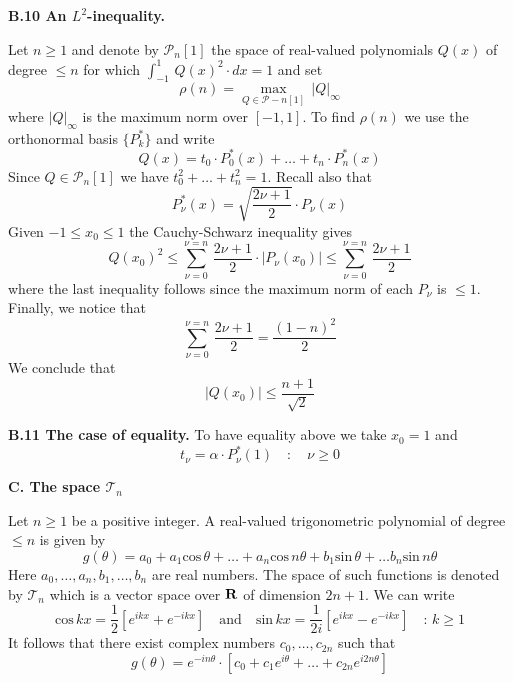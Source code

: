 \documentclass{amsart}
\begin{document}
{\centerline {\bf {B.10 An $L^2$-inequality.}}
\medskip

\noindent
Let $n\geq 1$ and denote by $\mathcal P_n[1]$ the space of
real-valued polynomials $Q(x)$ of degree $\leq n$ for which
$\int_{-1}^1\, Q(x)^2\cdot dx=1$ and set
\[ 
\rho(n)=\max_{Q\in\mathcal P-n[1]}\,
|Q|_\infty
\] 
where $|Q|_\infty$ is the maximum norm over
$[-1,1]$.
To find  $\rho(n)$ we use the orthonormal basis $\{P_k^*\}$
and write
\[
Q(x)=t_0\cdot P_0^*(x)+\ldots+t_n\cdot P_n^*(x)
\]
Since $Q\in\mathcal P_n[1]$ we have
$t_0^2+\ldots+t_n^2=1$. Recall also that
\[
P_\nu^*(x)=\sqrt{\frac{2\nu+1}{2}}\cdot P_\nu(x)
\]
Given $-1\leq x_0\leq 1$ the Cauchy-Schwarz inequality gives
\[
Q(x_0)^2\leq \sum_{\nu=0}^{\nu=n}\,
\frac{2\nu+1}{2}\cdot |P_\nu(x_0)|\leq 
\sum_{\nu=0}^{\nu=n}\,\frac{2\nu+1}{2}
\]
where the last inequality follows since the maximum norm of
each $P_\nu$ is $\leq 1$.
Finally, we notice that
\[
\sum_{\nu=0}^{\nu=n}\,\frac{2\nu+1}{2}
=\frac{(1-n)^2}{2}
\]
We conclude that
\[
|Q(x_0)|\leq \frac{n+1}{\sqrt{2}}
\]
\medskip

\noindent
{\bf B.11 The case of equality.}
To have equality above we take  $x_0=1$ and 
\[
 t_\nu=\alpha\cdot P^*_\nu(1)\quad\colon\quad \nu\geq 0
\]
\bigskip

























\centerline{\bf {C. The space $\mathcal T_n$}}
\bigskip

\noindent
Let $n\geq 1$ be a positive integer.
A real-valued trigonometric polynomial of degree
$\leq n$ is given by
\[
g(\theta)=a_0+
a_1\text{cos}\,\theta+\ldots
+
a_n\text{cos}\,n\theta+
b_1\text{sin}\,\theta+\ldots
b_n\text{sin}\,n\theta
\]
Here $a_0,\ldots,a_n,b_1,\ldots,b_n$ are real numbers.
The space of such functions is denoted by
$\mathcal T_n$ which  is a vector space over
${\bf{R}}$ of dimension $2n+1$.
We can write
\[
\text{cos}\,kx=\frac{1}{2}[e^{ikx}+e^{-ikx}]\quad\text{and}\quad
\text{sin}\,kx=\frac{1}{2i}[e^{ikx}-e^{-ikx}]\quad\colon\, k\geq 1
\]
It follows that there exist complex numbers
$c_0,\ldots,c_{2n}$ such that
\[
g(\theta)=e^{-in\theta}\cdot[c_0+c_1e^{i\theta}+\ldots+c_{2n}e^{i2n\theta}]
\]
\medskip

}
\end{document}
